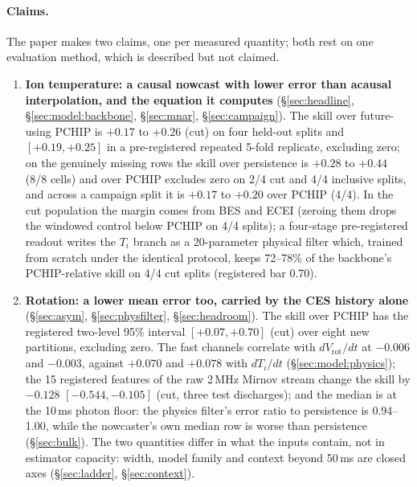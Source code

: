 \documentclass[10pt]{article}
\newcommand{\Ti}{\ensuremath{T_i}}
\newcommand{\Vrot}{\ensuremath{V_\mathrm{rot}}}
\begin{document}
\paragraph{Claims.}
The paper makes two claims, one per measured quantity; both rest on one evaluation
method, which is described but not claimed.
\begin{enumerate}
  \item \textbf{Ion temperature: a causal nowcast with lower error than acausal
        interpolation, and the equation it computes} (\S\ref{sec:headline},
        \S\ref{sec:model:backbone}, \S\ref{sec:mnar}, \S\ref{sec:campaign}). The
        skill over future-using PCHIP is $+0.17$ to $+0.26$ (cut) on four held-out
        splits and $[+0.19, +0.25]$ in a pre-registered repeated 5-fold replicate,
        excluding zero; on the genuinely missing rows the skill over persistence is $+0.28$
        to $+0.44$ (8/8 cells) and over PCHIP excludes zero on 2/4 cut and 4/4 inclusive
        splits, and across a campaign split it is $+0.17$ to $+0.20$ over PCHIP (4/4). In the cut population the margin comes from BES and ECEI (zeroing them drops
        the windowed control below PCHIP on 4/4 splits); a four-stage pre-registered
        readout
        writes the \Ti{} branch as a 20-parameter physical filter which, trained from
        scratch under the identical protocol, keeps 72--78\% of the backbone's
        PCHIP-relative skill on 4/4 cut splits (registered bar 0.70).
  \item \textbf{Rotation: a lower mean error too, carried by the CES history alone}
        (\S\ref{sec:asym}, \S\ref{sec:physfilter}, \S\ref{sec:headroom}). The
        skill over PCHIP has the registered two-level 95\% interval
        $[+0.07, +0.70]$ (cut) over eight new partitions, excluding zero. The fast
        channels correlate with $d\Vrot/dt$ at $-0.006$ and $-0.003$, against
        $+0.070$ and $+0.078$ with $d\Ti/dt$ (\S\ref{sec:model:physics}); the 15 registered features of the raw 2\,MHz Mirnov stream change the skill by
        $-0.128$ $[-0.544, -0.105]$ (cut, three test discharges); and the median is at the
        10\,ms photon floor: the physics filter's error ratio to persistence is
        0.94--1.00, while the nowcaster's own median row is worse than persistence
        (\S\ref{sec:bulk}). The two quantities differ in what the
        inputs contain, not in estimator capacity: width, model family and context
        beyond 50\,ms are closed axes (\S\ref{sec:ladder}, \S\ref{sec:context}).
\end{enumerate}
\end{document}
